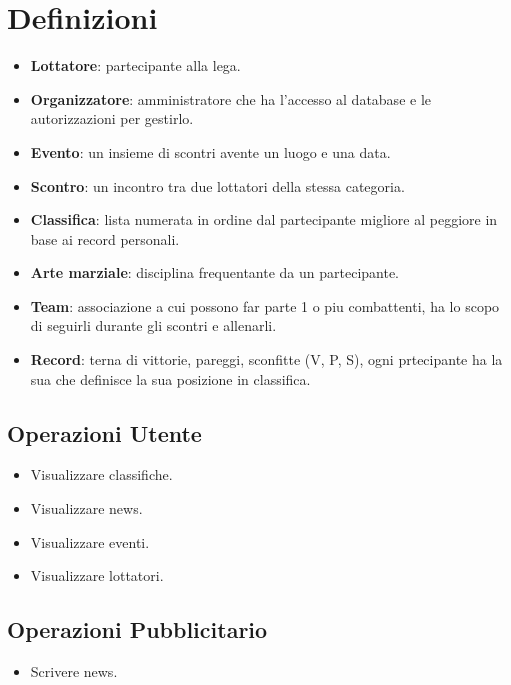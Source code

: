 \documentclass[a4paper,12pt]{report}
\begin{document}
\section{Definizioni}
\begin{itemize}
    \item \textbf{Lottatore}: partecipante alla lega.
    \item \textbf{Organizzatore}: amministratore che ha l'accesso al database e le autorizzazioni per gestirlo. 
    \item \textbf{Evento}: un insieme di scontri avente un luogo e una data.
    \item \textbf{Scontro}: un incontro tra due lottatori della stessa categoria.
    \item \textbf{Classifica}: lista numerata in ordine dal partecipante migliore al peggiore in base ai record personali.
    \item \textbf{Arte marziale}: disciplina frequentante da un partecipante.
    \item \textbf{Team}: associazione a cui possono far parte 1 o piu combattenti, ha lo scopo di seguirli durante gli scontri e allenarli.
    \item \textbf{Record}: terna di vittorie, pareggi, sconfitte (V, P, S), ogni prtecipante ha la sua che definisce la sua posizione in 
        classifica.
\end{itemize}

\subsection{Operazioni Utente}
\begin{itemize}
    \item Visualizzare classifiche.
    \item Visualizzare news.
    \item Visualizzare eventi.
    \item Visualizzare lottatori.
\end{itemize}

\subsection{Operazioni Pubblicitario}
\begin{itemize}
    \item Scrivere news.
\end{itemize}
\end{document}
